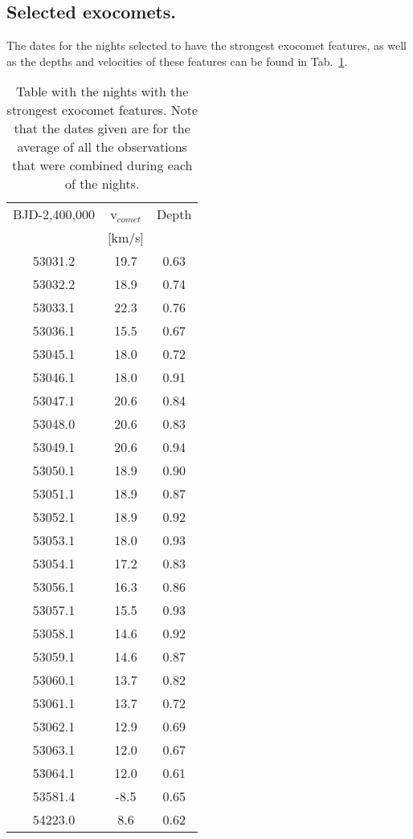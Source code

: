 \documentclass{aa}
\begin{document}



\begin{appendix}
    
\section{Selected exocomets.}\label{sec:app_FEBs}
The dates for the nights selected to have the strongest exocomet features, as well as the depths and velocities of these features can be found in Tab.~\ref{tab:FEB_data}.
\begin{table}
\caption{Table with the nights with the strongest exocomet features. Note that the dates given are for the average of all the observations that were combined during each of the nights.}\label{tab:FEB_data}
\begin{tabular}{c c c}
   BJD-2,400,000  &    v$_{comet}$  &  Depth\\
 & [km/s] & \\
 \hline
\hline
53031.2 & 19.7 & 0.63\\
53032.2 & 18.9 & 0.74\\
53033.1 & 22.3 & 0.76\\
53036.1 & 15.5 & 0.67\\
53045.1 & 18.0 & 0.72\\
53046.1 & 18.0 & 0.91\\
53047.1 & 20.6 & 0.84\\
53048.0 & 20.6 & 0.83\\
53049.1 & 20.6 & 0.94\\
53050.1 & 18.9 & 0.90\\
53051.1 & 18.9 & 0.87\\
53052.1 & 18.9 & 0.92\\
53053.1 & 18.0 & 0.93\\
53054.1 & 17.2 & 0.83\\
53056.1 & 16.3 & 0.86\\
53057.1 & 15.5 & 0.93\\
53058.1 & 14.6 & 0.92\\
53059.1 & 14.6 & 0.87\\
53060.1 & 13.7 & 0.82\\
53061.1 & 13.7 & 0.72\\
53062.1 & 12.9 & 0.69\\
53063.1 & 12.0 & 0.67\\
53064.1 & 12.0 & 0.61\\
53581.4 & -8.5 & 0.65\\
54223.0 &  8.6 & 0.62\\

\end{tabular}
\end{table}
\end{appendix}
\end{document}
